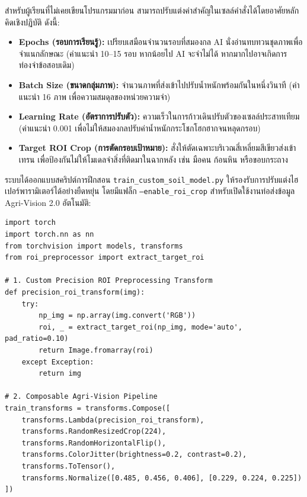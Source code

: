 \begin{academicNote}
สำหรับผู้เรียนที่ไม่เคยเขียนโปรแกรมมาก่อน สามารถปรับแต่งค่าสำคัญในเซลล์คำสั่งได้โดยอาศัยหลักคิดเชิงปฏิบัติ ดังนี้:
\begin{itemize}[leftmargin=1.2em, itemsep=3pt]
    \item \textbf{Epochs (รอบการเรียนรู้):} เปรียบเสมือนจำนวนรอบที่สมองกล AI นั่งอ่านทบทวนชุดภาพเพื่อจำแนกลักษณะ (ค่าแนะนำ 10--15 รอบ หากน้อยไป AI จะจำไม่ได้ หากมากไปอาจเกิดการท่องจำข้อสอบเดิม)
    \item \textbf{Batch Size (ขนาดกลุ่มภาพ):} จำนวนภาพที่ส่งเข้าไปปรับน้ำหนักพร้อมกันในหนึ่งวินาที (ค่าแนะนำ 16 ภาพ เพื่อความสมดุลของหน่วยความจำ)
    \item \textbf{Learning Rate (อัตราการปรับตัว):} ความเร็วในการก้าวเดินปรับตัวของเซลล์ประสาทเทียม (ค่าแนะนำ 0.001 เพื่อไม่ให้สมองกลปรับค่าน้ำหนักกระโชกโฮกฮากจนหลุดกรอบ)
    \item \textbf{Target ROI Crop (การตัดกรอบเป้าหมาย):} สั่งให้ตัดเฉพาะบริเวณสี่เหลี่ยมสีเขียวส่งเข้าเทรน เพื่อป้องกันไม่ให้โมเดลจำสิ่งที่ติดมาในฉากหลัง เช่น มือคน ก้อนหิน หรือขอบกระถาง
\end{itemize}
\end{academicNote}

\label{sec:pytorch_training}

ระบบได้ออกแบบสคริปต์การฝึกสอน \texttt{train\_custom\_soil\_model.py} ให้รองรับการปรับแต่งไฮเปอร์พารามิเตอร์ได้อย่างยืดหยุ่น โดยมีแฟล็ก \texttt{--enable\_roi\_crop} สำหรับเปิดใช้งานท่อส่งข้อมูล Agri-Vision 2.0 อัตโนมัติ:

\begin{tcolorbox}[title=\textbf{ตัวอย่างโค้ดท่อส่งข้อมูล Precision ROI และโครงสร้างโมเดล}]
\fontsize{8.5}{11}\selectfont
\begin{verbatim}
import torch
import torch.nn as nn
from torchvision import models, transforms
from roi_preprocessor import extract_target_roi

# 1. Custom Precision ROI Preprocessing Transform
def precision_roi_transform(img):
    try:
        np_img = np.array(img.convert('RGB'))
        roi, _ = extract_target_roi(np_img, mode='auto', pad_ratio=0.10)
        return Image.fromarray(roi)
    except Exception:
        return img

# 2. Composable Agri-Vision Pipeline
train_transforms = transforms.Compose([
    transforms.Lambda(precision_roi_transform),
    transforms.RandomResizedCrop(224),
    transforms.RandomHorizontalFlip(),
    transforms.ColorJitter(brightness=0.2, contrast=0.2),
    transforms.ToTensor(),
    transforms.Normalize([0.485, 0.456, 0.406], [0.229, 0.224, 0.225])
])
\end{verbatim}
\end{tcolorbox}

